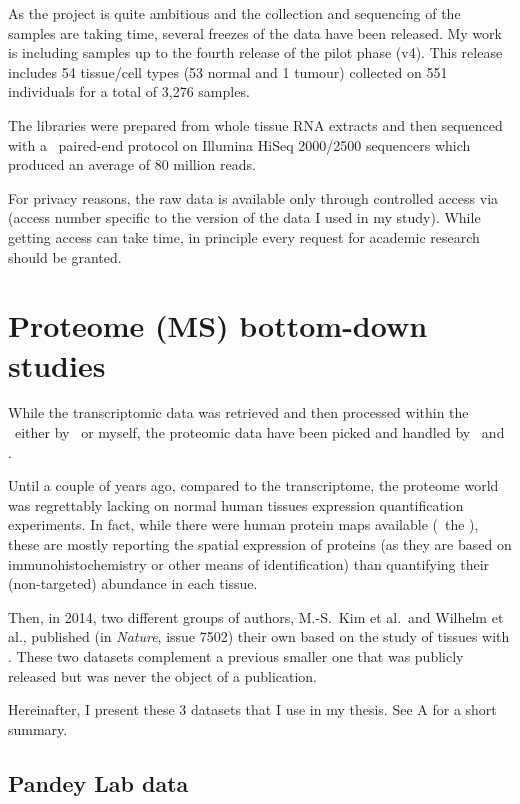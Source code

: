 As the project is quite ambitious and the collection and sequencing of the samples
are taking time, several freezes of the data have been released. My work is
including samples up to the fourth release of the pilot phase (v4). This
release includes 54 tissue/cell types (53 normal and 1 tumour)
collected on 551 individuals for a total of 3,276 samples.

The libraries were prepared from whole tissue \gls{RNA} extracts and then
sequenced with a \mRNA\ paired-end protocol on Illumina HiSeq 2000/2500
sequencers which produced an average of 80 million reads.

For privacy reasons, the raw data is available only through controlled access via
 (access number specific to the version of the data I used
in my study). While getting access can take time, in principle every request for
academic research should be granted.

\section{Proteome (MS) bottom-down studies}\label{sec:ProteoData}

While the transcriptomic data was retrieved and then processed within the \EBI\
either by \nuno\ or myself, the proteomic data have been picked and
handled by \jyoti\ and \james.

Until a couple of years ago, compared to the transcriptome, the proteome world
was regrettably lacking on normal human tissues expression quantification
experiments. In fact, while there were human protein maps available
(\eg\ the \hFo{Human Protein Atlas}{www.proteinatlas.org}), these
are mostly reporting the spatial expression of proteins (as they are based
on immunohistochemistry or other means of identification) than quantifying
their (non-targeted) abundance in each tissue.

Then, in 2014, two different groups of authors, M.-S.\ Kim et al.\
and Wilhelm et al., published (in \textit{Nature},
issue 7502) their own 
based on the study of tissues with \ms. These two datasets complement a previous
smaller one that was publicly released but was never the object of a publication.

Hereinafter, I present these 3 datasets that I use in my thesis.
See A for a short summary.

\subsection{Pandey Lab data}

